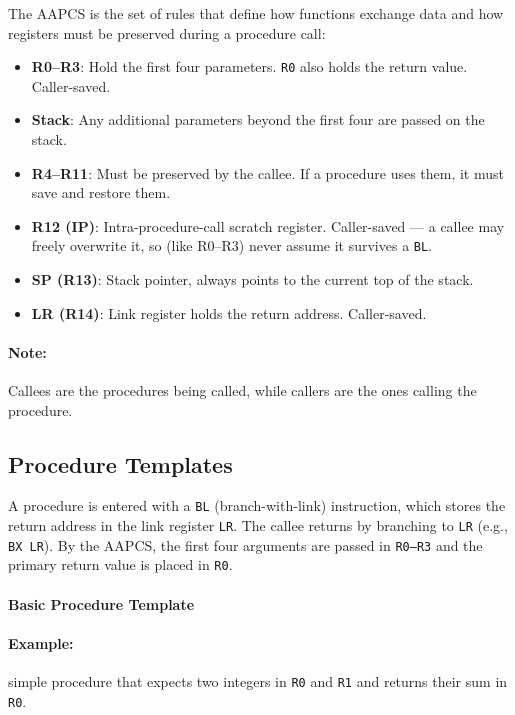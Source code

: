 The AAPCS is the set of rules that define how functions exchange data and how registers must be preserved during a procedure call:

\begin{itemize}[nosep]
  \item \textbf{R0--R3}: Hold the first four parameters. \texttt{R0} also holds the return value. Caller-saved.
  \item \textbf{Stack}: Any additional parameters beyond the first four are passed on the stack.
  \item \textbf{R4--R11}: Must be preserved by the callee. If a procedure uses them, it must save and restore them.
  \item \textbf{R12 (IP)}: Intra-procedure-call scratch register. Caller-saved — a callee may freely overwrite it, so (like R0--R3) never assume it survives a \texttt{BL}.
  \item \textbf{SP (R13)}: Stack pointer, always points to the current top of the stack.
  \item \textbf{LR (R14)}: Link register holds the return address. Caller-saved.
\end{itemize}
\paragraph{Note:} Callees are the procedures being called, while callers are the ones calling the procedure.

\subsection{Procedure Templates}

A procedure is entered with a \texttt{BL} (branch-with-link) instruction, which stores the return address in the link register \texttt{LR}. The callee returns by branching to \texttt{LR} (e.g., \texttt{BX LR}). By the AAPCS, the first four arguments are passed in \texttt{R0--R3} and the primary return value is placed in \texttt{R0}.
\newpage
\paragraph{Basic Procedure Template}

\paragraph{Example:} simple procedure that expects two integers in \texttt{R0} and \texttt{R1} and returns their sum in \texttt{R0}.

